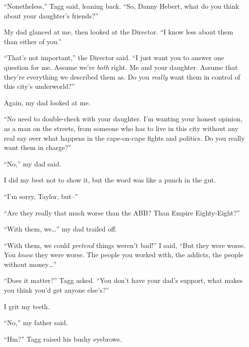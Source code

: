 ``Nonetheless,'' Tagg said, leaning back.  ``So, Danny Hebert, what do you think about your daughter's friends?''



My dad glanced at me, then looked at the Director.  ``I know less about them than either of you.''



``That's not important,'' the Director said.  ``I just want you to answer one question for me.  Assume we're \emph{both} right.  Me and your daughter.  Assume that they're everything we described them as.  Do you \emph{really} want them in control of this city's underworld?''



Again, my dad looked at me.



``No need to double-check with your daughter.  I'm wanting your honest opinion, as a man on the streets, from someone who has to live in this city without any real say over what happens in the cape-on-cape fights and politics.  Do you really want them in charge?''



``No,'' my dad said.



I did my best not to show it, but the word was like a punch in the gut.



``I'm sorry, Taylor, but--''



``Are they really that much worse than the ABB?  Than Empire Eighty-Eight?''



``With them, we\ldots'' my dad trailed off.



``With them, we could \emph{pretend }things weren't bad!'' I said, ``But they were worse.  You \emph{know} they were worse.  The people you worked with, the addicts, the people without money\ldots''



``Does it matter?'' Tagg asked.  ``You don't have your dad's support, what makes you think you'd get anyone else's?''



I grit my teeth.



``No,'' my father said.



``Hm?''  Tagg raised his bushy eyebrows.



